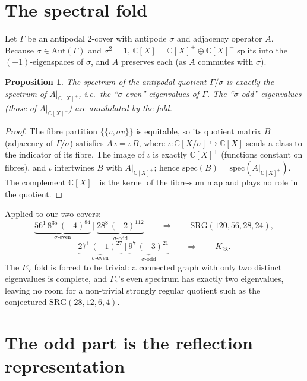 \documentclass[11pt]{article}
\newtheorem{proposition}{Proposition}
\theoremstyle{remark}
\newcommand{\CC}{\mathbb{C}}
\begin{document}
\section{The spectral fold}

Let $\Gamma$ be an antipodal $2$-cover with antipode $\sigma$ and adjacency
operator $A$. Because $\sigma\in\mathrm{Aut}(\Gamma)$ and $\sigma^2=1$,
$\CC[X]=\CC[X]^{+}\oplus\CC[X]^{-}$ splits into the $(\pm1)$-eigenspaces of
$\sigma$, and $A$ preserves each (as $A$ commutes with $\sigma$).

\begin{proposition}\label{prop:fold}
The spectrum of the antipodal quotient $\Gamma/\sigma$ is exactly the spectrum
of $A|_{\CC[X]^{+}}$, i.e.\ the ``$\sigma$-even'' eigenvalues of $\Gamma$. The
``$\sigma$-odd'' eigenvalues (those of $A|_{\CC[X]^{-}}$) are annihilated by the
fold.
\end{proposition}

\begin{proof}
The fibre partition $\{\{v,\sigma v\}\}$ is equitable, so its quotient matrix
$B$ (adjacency of $\Gamma/\sigma$) satisfies $A\,\iota=\iota\,B$, where
$\iota:\CC[X/\sigma]\hookrightarrow\CC[X]$ sends a class to the indicator of its
fibre. The image of $\iota$ is exactly $\CC[X]^{+}$ (functions constant on
fibres), and $\iota$ intertwines $B$ with $A|_{\CC[X]^{+}}$; hence
$\mathrm{spec}(B)=\mathrm{spec}(A|_{\CC[X]^{+}})$. The complement
$\CC[X]^{-}$ is the kernel of the fibre-sum map and plays no role in the
quotient.
\end{proof}

Applied to our two covers:
\[
  \underbrace{56^1\,8^{35}\,(-4)^{84}}_{\sigma\text{-even}}
  \ \big|\
  \underbrace{28^8\,(-2)^{112}}_{\sigma\text{-odd}}
  \qquad\Longrightarrow\qquad
  \mathrm{SRG}(120,56,28,24),
\]
\[
  \underbrace{27^1\,(-1)^{27}}_{\sigma\text{-even}}
  \ \big|\
  \underbrace{9^7\,(-3)^{21}}_{\sigma\text{-odd}}
  \qquad\Longrightarrow\qquad
  K_{28}.
\]
The $E_7$ fold is forced to be trivial: a connected graph with only two
distinct eigenvalues is complete, and $\Gamma_7$'s even spectrum has exactly
two eigenvalues, leaving no room for a non-trivial strongly regular quotient
such as the conjectured $\mathrm{SRG}(28,12,6,4)$.

\section{The odd part is the reflection representation}
\end{document}

